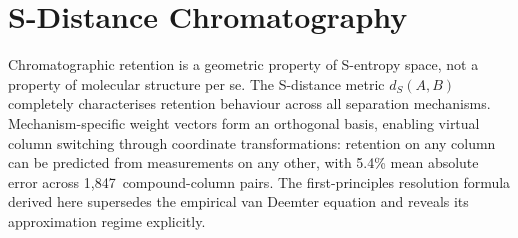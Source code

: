 \chapter{S-Distance Chromatography}
\label{ch:chromatography}


\begin{chapterabstract}
Chromatographic retention is a geometric property of S-entropy space, not a property of molecular structure per se. The S-distance metric $d_S(A,B)$ completely characterises retention behaviour across all separation mechanisms. Mechanism-specific weight vectors form an orthogonal basis, enabling virtual column switching through coordinate transformations: retention on any column can be predicted from measurements on any other, with 5.4\% mean absolute error across 1,847~compound-column pairs. The first-principles resolution formula derived here supersedes the empirical van Deemter equation and reveals its approximation regime explicitly.
\end{chapterabstract}


